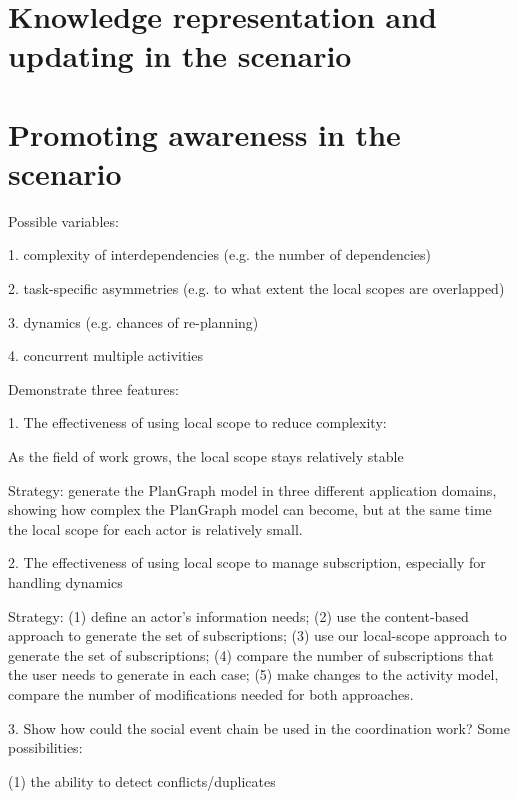 \section{Knowledge representation and updating in the scenario} %
\label{sec:knowledge_representation_and_updating_in_the_scenario}


\section{Promoting awareness in the scenario} %
\label{sec:promoting_awareness_in_the_scenario}


Possible variables:

1. complexity of interdependencies (e.g. the number of dependencies)

2. task-specific asymmetries (e.g. to what extent the local scopes are overlapped)
 
3. dynamics (e.g. chances of re-planning)

4. concurrent multiple activities

Demonstrate three features:

1. The effectiveness of using local scope to reduce complexity:

As the field of work grows, the local scope stays relatively stable

Strategy: generate the PlanGraph model in three different application domains, showing how complex the PlanGraph model can become, but at the same time the local scope for each actor is relatively small.

2. The effectiveness of using local scope to manage subscription, especially for handling dynamics

Strategy: (1) define an actor's information needs; (2) use the content-based approach to generate the set of subscriptions; (3) use our local-scope approach to generate the set of subscriptions; (4) compare the number of subscriptions that the user needs to generate in each case; (5) make changes to the activity model, compare the number of modifications needed for both approaches.

3. Show how could the social event chain be used in the coordination work? Some possibilities:

(1) the ability to detect conflicts/duplicates

